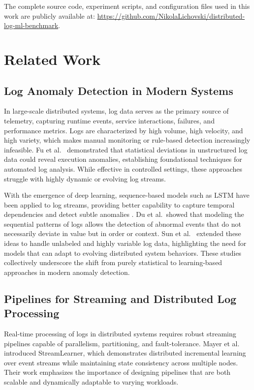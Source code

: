 \documentclass[12pt,a4paper]{report}
\begin{document}
The complete source code, experiment scripts, and configuration files used in this work are publicly available at:
\url{https://github.com/NikolaLichovski/distributed-log-ml-benchmark}.

\chapter{Related Work}

\section{Log Anomaly Detection in Modern Systems}
In large-scale distributed systems, log data serves as the primary source of telemetry, capturing runtime events, service interactions, failures, and performance metrics. Logs are characterized by high volume, high velocity, and high variety, which makes manual monitoring or rule-based detection increasingly infeasible. Fu et al.\ \cite{Fu2009} demonstrated that statistical deviations in unstructured log data could reveal execution anomalies, establishing foundational techniques for automated log analysis. While effective in controlled settings, these approaches struggle with highly dynamic or evolving log streams.

With the emergence of deep learning, sequence-based models such as LSTM have been applied to log streams, providing better capability to capture temporal dependencies and detect subtle anomalies \cite{Du2017}. Du et al.\ showed that modeling the sequential patterns of logs allows the detection of abnormal events that do not necessarily deviate in value but in order or context. Sun et al.\ \cite{Sun2021} extended these ideas to handle unlabeled and highly variable log data, highlighting the need for models that can adapt to evolving distributed system behaviors. These studies collectively underscore the shift from purely statistical to learning-based approaches in modern anomaly detection.

\section{Pipelines for Streaming and Distributed Log Processing}
Real-time processing of logs in distributed systems requires robust streaming pipelines capable of parallelism, partitioning, and fault-tolerance. Mayer et al.\ \cite{Mayer2017} introduced StreamLearner, which demonstrates distributed incremental learning over event streams while maintaining state consistency across multiple nodes. Their work emphasizes the importance of designing pipelines that are both scalable and dynamically adaptable to varying workloads.
\end{document}

